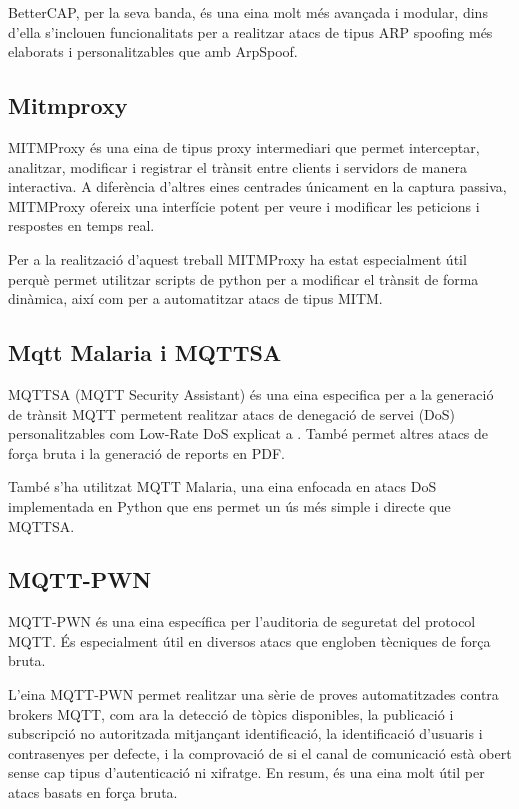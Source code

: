     BetterCAP, per la seva banda, és una eina molt més avançada i modular, dins d'ella s'inclouen funcionalitats per a realitzar atacs de tipus ARP spoofing més elaborats i personalitzables que amb ArpSpoof.

    \subsection{Mitmproxy}
    \label{sec:MITMProxy}
    MITMProxy és una eina de tipus proxy intermediari que permet interceptar, analitzar, modificar i registrar el trànsit entre clients i servidors de manera interactiva. A diferència d'altres eines centrades únicament en la captura passiva, MITMProxy ofereix una interfície potent per veure i modificar les peticions i respostes en temps real.

    Per a la realització d'aquest treball MITMProxy ha estat especialment útil perquè permet utilitzar scripts de python per a modificar el trànsit de forma dinàmica, així com per a automatitzar atacs de tipus MITM. \cite{mitmproxyexp}

    \subsection{Mqtt Malaria i MQTTSA}
    \label{sec:MQTTSA}
    MQTTSA (MQTT Security Assistant) és una eina especifica per a la generació de trànsit MQTT permetent realitzar atacs de denegació de servei (DoS) personalitzables com Low-Rate DoS explicat a \cite{lowrateDDoSexp}. També permet altres atacs de força bruta i la generació de reports en PDF. \cite{mqttsaexp}

    També s'ha utilitzat MQTT Malaria, una eina enfocada en atacs DoS implementada en Python que ens permet un ús més simple i directe que MQTTSA. \cite{mqttmalaria}
    
    \subsection{MQTT-PWN}
    \label{sec:MQTTPWN}
    MQTT-PWN és una eina específica per l’auditoria de seguretat del protocol MQTT. És especialment útil en diversos atacs que engloben tècniques de força bruta. \cite{mqttpwnexp}
    
    L’eina MQTT-PWN permet realitzar una sèrie de proves automatitzades contra brokers MQTT, com ara la detecció de tòpics disponibles, la publicació i subscripció no autoritzada mitjançant identificació, la identificació d'usuaris i contrasenyes per defecte, i la comprovació de si el canal de comunicació està obert sense cap tipus d’autenticació ni xifratge. En resum, és una eina molt útil per atacs basats en força bruta. 
  

